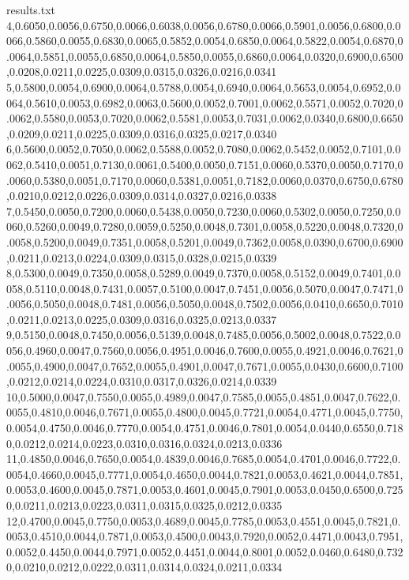 \begin{filecontents*}{results.txt}
4,0.6050,0.0056,0.6750,0.0066,0.6038,0.0056,0.6780,0.0066,0.5901,0.0056,0.6800,0.0066,0.5860,0.0055,0.6830,0.0065,0.5852,0.0054,0.6850,0.0064,0.5822,0.0054,0.6870,0.0064,0.5851,0.0055,0.6850,0.0064,0.5850,0.0055,0.6860,0.0064,0.0320,0.6900,0.6500,0.0208,0.0211,0.0225,0.0309,0.0315,0.0326,0.0216,0.0341
5,0.5800,0.0054,0.6900,0.0064,0.5788,0.0054,0.6940,0.0064,0.5653,0.0054,0.6952,0.0064,0.5610,0.0053,0.6982,0.0063,0.5600,0.0052,0.7001,0.0062,0.5571,0.0052,0.7020,0.0062,0.5580,0.0053,0.7020,0.0062,0.5581,0.0053,0.7031,0.0062,0.0340,0.6800,0.6650,0.0209,0.0211,0.0225,0.0309,0.0316,0.0325,0.0217,0.0340
6,0.5600,0.0052,0.7050,0.0062,0.5588,0.0052,0.7080,0.0062,0.5452,0.0052,0.7101,0.0062,0.5410,0.0051,0.7130,0.0061,0.5400,0.0050,0.7151,0.0060,0.5370,0.0050,0.7170,0.0060,0.5380,0.0051,0.7170,0.0060,0.5381,0.0051,0.7182,0.0060,0.0370,0.6750,0.6780,0.0210,0.0212,0.0226,0.0309,0.0314,0.0327,0.0216,0.0338
7,0.5450,0.0050,0.7200,0.0060,0.5438,0.0050,0.7230,0.0060,0.5302,0.0050,0.7250,0.0060,0.5260,0.0049,0.7280,0.0059,0.5250,0.0048,0.7301,0.0058,0.5220,0.0048,0.7320,0.0058,0.5200,0.0049,0.7351,0.0058,0.5201,0.0049,0.7362,0.0058,0.0390,0.6700,0.6900,0.0211,0.0213,0.0224,0.0309,0.0315,0.0328,0.0215,0.0339
8,0.5300,0.0049,0.7350,0.0058,0.5289,0.0049,0.7370,0.0058,0.5152,0.0049,0.7401,0.0058,0.5110,0.0048,0.7431,0.0057,0.5100,0.0047,0.7451,0.0056,0.5070,0.0047,0.7471,0.0056,0.5050,0.0048,0.7481,0.0056,0.5050,0.0048,0.7502,0.0056,0.0410,0.6650,0.7010,0.0211,0.0213,0.0225,0.0309,0.0316,0.0325,0.0213,0.0337
9,0.5150,0.0048,0.7450,0.0056,0.5139,0.0048,0.7485,0.0056,0.5002,0.0048,0.7522,0.0056,0.4960,0.0047,0.7560,0.0056,0.4951,0.0046,0.7600,0.0055,0.4921,0.0046,0.7621,0.0055,0.4900,0.0047,0.7652,0.0055,0.4901,0.0047,0.7671,0.0055,0.0430,0.6600,0.7100,0.0212,0.0214,0.0224,0.0310,0.0317,0.0326,0.0214,0.0339
10,0.5000,0.0047,0.7550,0.0055,0.4989,0.0047,0.7585,0.0055,0.4851,0.0047,0.7622,0.0055,0.4810,0.0046,0.7671,0.0055,0.4800,0.0045,0.7721,0.0054,0.4771,0.0045,0.7750,0.0054,0.4750,0.0046,0.7770,0.0054,0.4751,0.0046,0.7801,0.0054,0.0440,0.6550,0.7180,0.0212,0.0214,0.0223,0.0310,0.0316,0.0324,0.0213,0.0336
11,0.4850,0.0046,0.7650,0.0054,0.4839,0.0046,0.7685,0.0054,0.4701,0.0046,0.7722,0.0054,0.4660,0.0045,0.7771,0.0054,0.4650,0.0044,0.7821,0.0053,0.4621,0.0044,0.7851,0.0053,0.4600,0.0045,0.7871,0.0053,0.4601,0.0045,0.7901,0.0053,0.0450,0.6500,0.7250,0.0211,0.0213,0.0223,0.0311,0.0315,0.0325,0.0212,0.0335
12,0.4700,0.0045,0.7750,0.0053,0.4689,0.0045,0.7785,0.0053,0.4551,0.0045,0.7821,0.0053,0.4510,0.0044,0.7871,0.0053,0.4500,0.0043,0.7920,0.0052,0.4471,0.0043,0.7951,0.0052,0.4450,0.0044,0.7971,0.0052,0.4451,0.0044,0.8001,0.0052,0.0460,0.6480,0.7320,0.0210,0.0212,0.0222,0.0311,0.0314,0.0324,0.0211,0.0334

\end{filecontents*}

